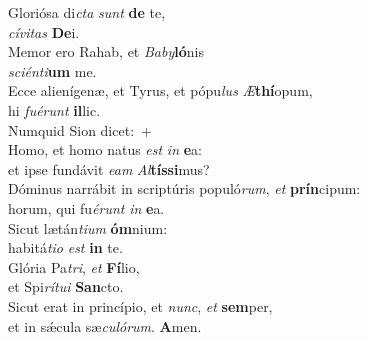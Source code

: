 \evenverse Gloriósa di\textit{cta} \textit{sunt} \textbf{de} te,~\*\\
\evenverse \textit{cí}\textit{vi}\textit{tas} \textbf{De}i.\\
\oddverse Memor ero Rahab, et \textit{Ba}\textit{by}\textbf{ló}nis~\*\\
\oddverse \textit{sci}\textit{én}\textit{ti}\textbf{um} me.\\
\evenverse Ecce alienígenæ, et Tyrus, et pópu\textit{lus} \textit{Æ}\textbf{thí}opum,~\*\\
\evenverse hi \textit{fu}\textit{é}\textit{runt} \textbf{il}lic.\\
\oddverse Numquid Sion dicet:~+\\
\oddverse  Homo, et homo natus \textit{est} \textit{in} \textbf{e}a:~\*\\
\oddverse et ipse fundávit \textit{e}\textit{am} \textit{Al}\textbf{tís}\textbf{si}mus?\\
\evenverse Dóminus narrábit in scriptúris populó\textit{rum}, \textit{et} \textbf{prín}cipum:~\*\\
\evenverse horum, qui fu\textit{é}\textit{runt} \textit{in} \textbf{e}a.\\
\oddverse Sicut lætán\textit{ti}\textit{um} \textbf{óm}nium:~\*\\
\oddverse habitá\textit{ti}\textit{o} \textit{est} \textbf{in} te.\\
\evenverse Glória Pa\textit{tri}, \textit{et} \textbf{Fí}lio,~\*\\
\evenverse et Spi\textit{rí}\textit{tu}\textit{i} \textbf{San}cto.\\
\oddverse Sicut erat in princípio, et \textit{nunc}, \textit{et} \textbf{sem}per,~\*\\
\oddverse et in sǽcula sæ\textit{cu}\textit{ló}\textit{rum}. \textbf{A}men.\\
